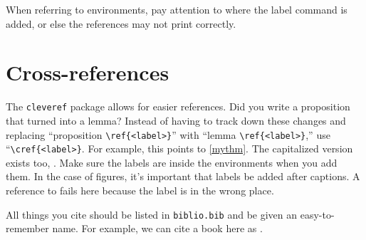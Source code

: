 When referring to environments, pay attention to where the label command is added, or else the references may not print correctly.

\section{Cross-references}
The \texttt{cleveref} package allows for easier references. Did you write a proposition that turned into a lemma? Instead of having to track down these changes and replacing ``proposition \verb|\ref{<label>}|'' with ``lemma \verb|\ref{<label>}|,'' use ``\verb|\cref{<label>}|. For example, this points to \cref{mythm}. The capitalized version exists too, . Make sure the labels are inside the environments when you add them. In the case of figures, it's important that labels be added after captions. A reference to  fails here because the label is in the wrong place. 

All things you cite should be listed in \texttt{biblio.bib} and be given an easy-to-remember name. For example, we can cite a book here as \cite{sample}. 
